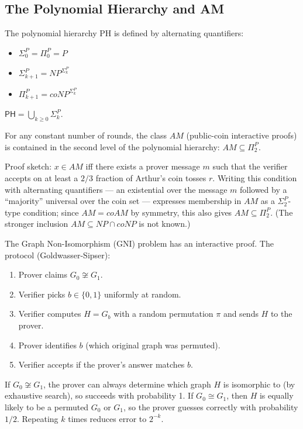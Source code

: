 \subsection{The Polynomial Hierarchy and AM}

\begin{definition}
The polynomial hierarchy PH is defined by alternating quantifiers:
\begin{itemize}
\item $\Sigma_0^P = \Pi_0^P = P$
\item $\Sigma_{k+1}^P = NP^{\Sigma_k^P}$
\item $\Pi_{k+1}^P = coNP^{\Sigma_k^P}$
\end{itemize}
$\mathsf{PH} = \bigcup_{k \ge 0} \Sigma_k^P$.
\end{definition}

\begin{theorem}[AM $\subseteq$ $\Pi_2^P$]
For any constant number of rounds, the class $AM$ (public-coin interactive proofs) is contained in the second level of the polynomial hierarchy: $AM \subseteq \Pi_2^P$.

Proof sketch: $x \in AM$ iff there exists a prover message $m$ such that the verifier accepts on at least a $2/3$ fraction of Arthur's coin tosses $r$. Writing this condition with alternating quantifiers --- an existential over the message $m$ followed by a ``majority'' universal over the coin set --- expresses membership in $AM$ as a $\Sigma_2^P$-type condition; since $AM = coAM$ by symmetry, this also gives $AM \subseteq \Pi_2^P$. (The stronger inclusion $AM \subseteq NP \cap coNP$ is not known.)
\end{theorem}

\begin{theorem}
The Graph Non-Isomorphism (GNI) problem has an interactive proof. The protocol (Goldwasser-Sipser):
\begin{enumerate}
\item Prover claims $G_0 \not\cong G_1$.
\item Verifier picks $b \in \{0, 1\}$ uniformly at random.
\item Verifier computes $H = G_b$ with a random permutation $\pi$ and sends $H$ to the prover.
\item Prover identifies $b$ (which original graph was permuted).
\item Verifier accepts if the prover's answer matches $b$.
\end{enumerate}
If $G_0 \not\cong G_1$, the prover can always determine which graph $H$ is isomorphic to (by exhaustive search), so succeeds with probability 1. If $G_0 \cong G_1$, then $H$ is equally likely to be a permuted $G_0$ or $G_1$, so the prover guesses correctly with probability $1/2$. Repeating $k$ times reduces error to $2^{-k}$.
\end{theorem}

